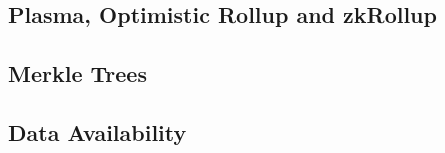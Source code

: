 \documentclass[../../thesis.tex]{subfiles}
\begin{document}




\subsection{Plasma, Optimistic Rollup and zkRollup}

\subsection{Merkle Trees}
\subsection{Data Availability}
\end{document}
